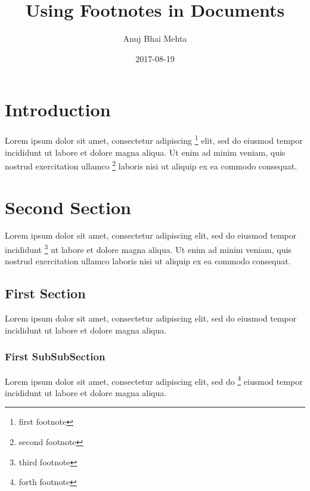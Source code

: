 \documentclass{article}
\title{Using Footnotes in Documents}
\date{2017-08-19}
\author{Anuj Bhai Mehta}
\begin{document}
 
\maketitle
 
\section{Introduction}
  
Lorem ipsum dolor sit amet, consectetur adipiscing \footnote{first footnote} elit, sed do eiusmod tempor incididunt ut labore et dolore magna aliqua. Ut enim ad minim veniam, quis nostrud exercitation ullamco \footnote{second footnote} laboris nisi ut aliquip ex ea commodo consequat.
 
\section{Second Section}
 
Lorem ipsum dolor sit amet, consectetur adipiscing elit, sed do eiusmod tempor incididunt \footnote{third footnote} ut labore et dolore magna aliqua. Ut enim ad minim veniam, quis nostrud exercitation ullamco laboris nisi ut aliquip ex ea commodo consequat.


\subsection{First Section}

Lorem ipsum dolor sit amet, consectetur adipiscing elit, sed do eiusmod tempor incididunt ut labore et dolore magna aliqua.

\subsubsection{First SubSubSection}

Lorem ipsum dolor sit amet, consectetur adipiscing elit, sed do \footnote{forth footnote} eiusmod tempor incididunt ut labore et dolore magna aliqua. 
\end{document}
